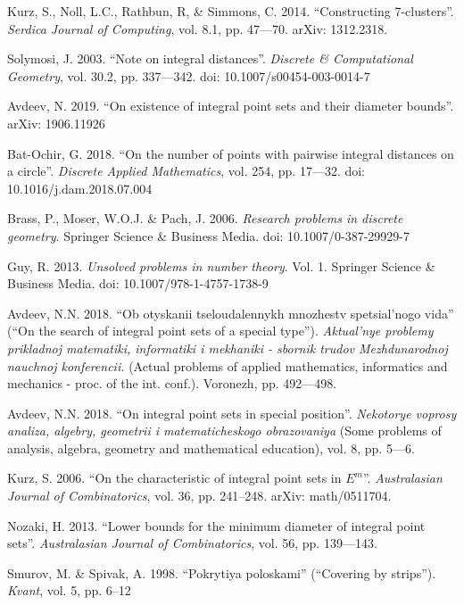 \begin{engbibliography}{99}
	Kurz, S., Noll, L.C., Rathbun, R, \& Simmons, C. 2014.
	“Constructing 7-clusters”.
	\emph{Serdica Journal of Computing}, vol. 8.1, pp. 47—70. arXiv: 1312.2318.

	Solymosi, J. 2003.
	“Note on integral distances”.
	\emph{Discrete \& Computational Geometry}, vol. 30.2, pp. 337—342.
	doi: 10.1007/s00454-003-0014-7

	Avdeev, N. 2019.
	“On existence of integral point sets and their diameter bounds”.
	arXiv: 1906.11926

	Bat-Ochir, G. 2018.
	“On the number of points with pairwise integral distances on a circle”.
	\emph{Discrete Applied Mathematics}, vol. 254, pp. 17—32.
	doi: 10.1016/j.dam.2018.07.004

	Brass, P., Moser, W.O.J. \& Pach, J. 2006.
	\emph{Research problems in discrete geometry}. Springer Science \& Business Media.
	doi: 10.1007/0-387-29929-7

	Guy, R. 2013.
	\emph{Unsolved problems in number theory}. Vol. 1.
	Springer Science \& Business Media.
	doi: 10.1007/978-1-4757-1738-9

	Avdeev, N.N. 2018.
	“Ob otyskanii tseloudalennykh mnozhestv spetsial'nogo vida”
	(``On the search of integral point sets of a special type'').
	\emph{
		Aktual'nye problemy prikladnoj matematiki, informatiki i mekhaniki
		- sbornik trudov Mezhdunarodnoj nauchnoj konferencii.
	}
	(Actual problems of applied mathematics, informatics and mechanics
	- proc. of the int. conf.).
	Voronezh, pp. 492—498.

	Avdeev, N.N. 2018.
	“On integral point sets in special position”.
	\emph{Nekotorye voprosy analiza, algebry, geometrii i matematicheskogo obrazovaniya}
	(Some problems of analysis, algebra, geometry and mathematical education), vol. 8, pp. 5—6.

	Kurz, S. 2006.
	“On the characteristic of integral point sets in $E^m$”.
	\emph{Australasian Journal of Combinatorics}, vol. 36, pp. 241–248.
	arXiv: math/0511704.

	Nozaki, H. 2013.
	“Lower bounds for the minimum diameter of integral point sets”.
	\emph{Australasian Journal of Combinatorics}, vol. 56, pp. 139—143.

	Smurov, M. \& Spivak, A. 1998.
	“Pokrytiya poloskami” (``Covering by strips'').
	\emph{Kvant}, vol. 5, pp. 6--12

\end{engbibliography}
